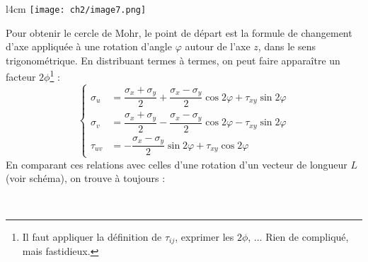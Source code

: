     \begin{wrapfigure}[7]{l}{4cm}
    \texttt{[image: ch2/image7.png]}
    \end{wrapfigure}
    Pour obtenir le cercle de Mohr, le point de départ est la formule de changement d'axe appliquée à une
    rotation d'angle $\varphi$ autour de l'axe $z$, dans le sens trigonométrique. En distribuant termes à
    termes, on peut faire apparaître un facteur $2\phi$\footnote{Il faut appliquer la définition de 
    $\tau_{ij}$, exprimer les $2\phi$, ... Rien de compliqué, mais fastidieux.} :
    \begin{equation}
    \left\{\begin{array}{ll}
    \sigma_u &=  \dfrac{\sigma_x+\sigma_y}{2} + \dfrac{\sigma_x-\sigma_y}{2}\cos 2\varphi + \tau_{xy}\sin
    2\varphi\\
    \sigma_v &=  \dfrac{\sigma_x+\sigma_y}{2} - \dfrac{\sigma_x-\sigma_y}{2}\cos 2\varphi - \tau_{xy}\sin
    2\varphi\\
    \tau_{uv} &= -\dfrac{\sigma_x-\sigma_y}{2}\sin 2\varphi + \tau_{xy}\cos 2\varphi
    \end{array}\right.
    \end{equation}
    En comparant ces relations avec celles d'une rotation d'un vecteur de longueur $L$ (voir schéma), on
    trouve à toujours :
    
    \ \\
    
